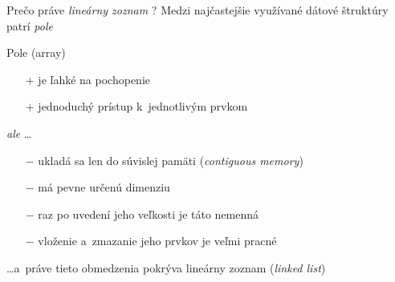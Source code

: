 \documentclass[slovak, 11pt]{beamer}
\begin{document}
\begin{frame}{Prečo práve \emph{lineárny zoznam} ?}
    Medzi najčastejšie využívané dátové štruktúry patrí \emph{pole}
    \begin{block}{Pole (array)}
        \begin{itemize}
            \item[$+$] je ľahké na pochopenie
            \item[$+$] jednoduchý prístup k~jednotlivým prvkom 
        \end{itemize}
        \emph{ale} \dots
        \begin{itemize}
            \item[$-$] ukladá sa len do súvislej pamäti (\emph{contiguous memory})
            \item[$-$] má pevne určenú dimenziu
            \item[$-$] raz po uvedení jeho veľkosti je táto nemenná
            \item[$-$] vloženie a~zmazanie jeho prvkov je veľmi pracné
        \end{itemize}
    \end{block}
    \dots a~práve tieto obmedzenia pokrýva lineárny zoznam (\emph{linked list})
\end{frame}

\end{document}
